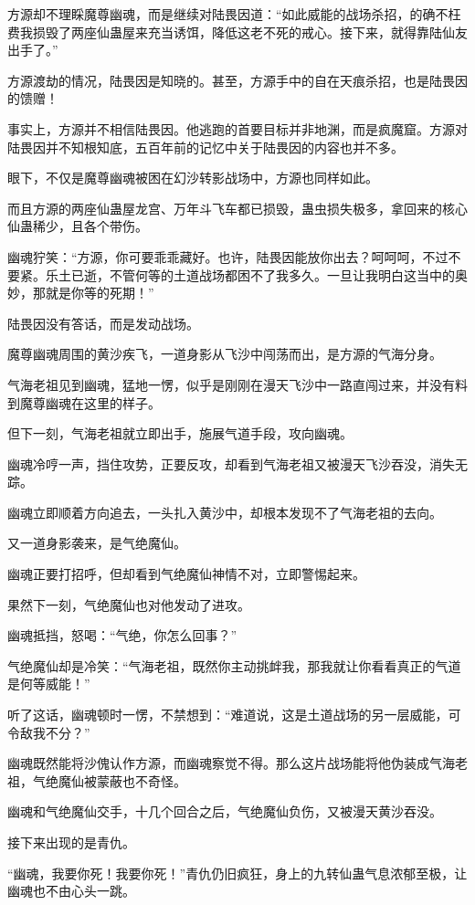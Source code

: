 \begin{this_body}
方源却不理睬魔尊幽魂，而是继续对陆畏因道：“如此威能的战场杀招，的确不枉费我损毁了两座仙蛊屋来充当诱饵，降低这老不死的戒心。接下来，就得靠陆仙友出手了。”

方源渡劫的情况，陆畏因是知晓的。甚至，方源手中的自在天痕杀招，也是陆畏因的馈赠！

事实上，方源并不相信陆畏因。他逃跑的首要目标并非地渊，而是疯魔窟。方源对陆畏因并不知根知底，五百年前的记忆中关于陆畏因的内容也并不多。

眼下，不仅是魔尊幽魂被困在幻沙转影战场中，方源也同样如此。

而且方源的两座仙蛊屋龙宫、万年斗飞车都已损毁，蛊虫损失极多，拿回来的核心仙蛊稀少，且各个带伤。

幽魂狞笑：“方源，你可要乖乖藏好。也许，陆畏因能放你出去？呵呵呵，不过不要紧。乐土已逝，不管何等的土道战场都困不了我多久。一旦让我明白这当中的奥妙，那就是你等的死期！”

陆畏因没有答话，而是发动战场。

魔尊幽魂周围的黄沙疾飞，一道身影从飞沙中闯荡而出，是方源的气海分身。

气海老祖见到幽魂，猛地一愣，似乎是刚刚在漫天飞沙中一路直闯过来，并没有料到魔尊幽魂在这里的样子。

但下一刻，气海老祖就立即出手，施展气道手段，攻向幽魂。

幽魂冷哼一声，挡住攻势，正要反攻，却看到气海老祖又被漫天飞沙吞没，消失无踪。

幽魂立即顺着方向追去，一头扎入黄沙中，却根本发现不了气海老祖的去向。

又一道身影袭来，是气绝魔仙。

幽魂正要打招呼，但却看到气绝魔仙神情不对，立即警惕起来。

果然下一刻，气绝魔仙也对他发动了进攻。

幽魂抵挡，怒喝：“气绝，你怎么回事？”

气绝魔仙却是冷笑：“气海老祖，既然你主动挑衅我，那我就让你看看真正的气道是何等威能！”

听了这话，幽魂顿时一愣，不禁想到：“难道说，这是土道战场的另一层威能，可令敌我不分？”

幽魂既然能将沙傀认作方源，而幽魂察觉不得。那么这片战场能将他伪装成气海老祖，气绝魔仙被蒙蔽也不奇怪。

幽魂和气绝魔仙交手，十几个回合之后，气绝魔仙负伤，又被漫天黄沙吞没。

接下来出现的是青仇。

“幽魂，我要你死！我要你死！”青仇仍旧疯狂，身上的九转仙蛊气息浓郁至极，让幽魂也不由心头一跳。


\end{this_body}
